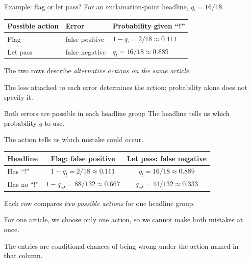 \documentclass[aspectratio=43,10pt]{beamer}
\begin{document}
\begin{frame}{Example: flag or let pass?}
For an exclamation-point headline, $q_!=16/18$.
\medskip
\begin{center}
\begin{tabular}{lll}
\toprule
Possible action & Error & Probability given ``!'' \\
\midrule
Flag & false positive & $1-q_!=2/18\approx0.111$ \\
Let pass & false negative & $q_!=16/18\approx0.889$ \\
\bottomrule
\end{tabular}
\end{center}

\medskip
The two rows describe \emph{alternative actions on the same article}.

\medskip
The loss attached to each error determines the action; probability alone
does not specify it.
\end{frame}

\begin{frame}{Both errors are possible in each headline group}
The headline tells us which probability $q$ to use.

\medskip
The action tells us which mistake could occur.

\medskip
\begin{center}
\begin{tabular}{lcc}
\toprule
Headline & Flag: false positive & Let pass: false negative \\
\midrule
Has ``!'' & $1-q_!=2/18\approx0.111$ & $q_!=16/18\approx0.889$ \\
Has no ``!'' & $1-q_{\neg !}=88/132\approx0.667$ & $q_{\neg !}=44/132\approx0.333$ \\
\bottomrule
\end{tabular}
\end{center}

\medskip
Each row compares \emph{two possible actions} for one headline group.

\medskip
For one article, we choose only one action, so we cannot make both
mistakes at once.

\medskip
The entries are conditional chances of being wrong under the action named in that column.
\end{frame}
\end{document}
